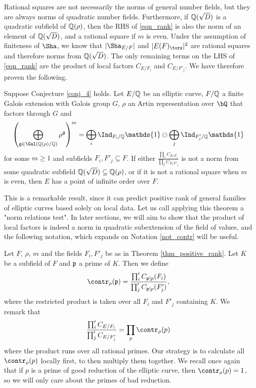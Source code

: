 Rational squares are not necessarily the norms of general number fields, but they are always norms of quadratic number fields. Furthermore, if $\mathbb{Q}(\sqrt{D})$ is a quadratic subfield of $\mathbb{Q}(\rho)$, then the RHS of \eqref{eqn_rank} is also the norm of an element of $\mathbb{Q}(\sqrt{D})$, and a rational square if $m$ is even. Under the assumption of finiteness of $\Sha$, we know that $|\Sha_{E/F}|$ and $|E(F)_{\tors}|^2$ are rational squares and therefore norms from $\mathbb{Q}(\sqrt{D})$. The only remaining terms on the LHS of \eqref{eqn_rank} are the product of local factors $C_{E/F_i}$ and $C_{E/F'_j}$. We have therefore proven the following.

\begin{thm}\cite[Theorem 33]{DEW1} \label{thm_positive_rank}
    Suppose Conjecture \ref*{conj_4} holds. Let $E/\mathbb{Q}$ be an elliptic curve, $F/\mathbb{Q}$ a finite Galois extension with Galois group $G$, $\rho$ an Artin representation over $\bQ$ that factors through $G$ and 
    $$\left(\bigoplus_{\mathfrak{g}\in\Gal(\QQ(\rho)/\QQ)}\rho^{\mathfrak{g}}\right)^m=\bigoplus_i\Ind_{F_i/\QQ}\mathds{1}\ominus\bigoplus_j\Ind_{F'_j/\QQ}\mathds{1}$$
    for some $m\geq 1$ and subfields $F_i,F'_j\subseteq F$. If either $\frac{\prod_i C_{E/F_i}}{\prod_j C_{E/F'_j}}$ is not a norm from some quadratic subfield $\mathbb{Q}(\sqrt{D})\subseteq\mathbb{Q}(\rho)$, or if it is not a rational square when $m$ is even, then $E$ has a point of infinite order over $F$.
\end{thm}

This is a remarkable result, since it can predict positive rank of general families of elliptic curves based solely on local data. Let us call applying this theorem a "norm relations test". In later sections, we will aim to show that the product of local factors is indeed a norm in quadratic subextension of the field of values, and the following notation, which expands on Notation \ref*{not_contr} will be useful.

\begin{notation} \label{not_total_contr}
    Let $F$, $\rho$, $m$ and the fields $F_i,F'_j$ be as in Theorem \ref*{thm_positive_rank}. Let $K$ be a subfield of $F$ and $\mathfrak{p}$ a prime of $K$. Then we define
    $$\contr_\rho(\pp)=\frac{\prod'_i C_{\pp\mid p}(F_i)}{\prod'_j C_{\pp\mid p}(F'_j)},$$
    where the restricted product is taken over all $F_i$ and $F'_j$ containing $K$.
    We remark that 
    $$\frac{\prod'_i C_{E/F_i}}{\prod'_j C_{E/F'_j}}=\prod_p\contr_\rho(p)$$
    where the product runs over all rational primes. Our strategy is to calculate all $\contr_\rho(p)$ locally first, to then multiply them together. We recall once again that if $p$ is a prime of good reduction of the elliptic curve, then $\contr_\rho(p)=1$, so we will only care about the primes of bad reduction.
\end{notation}

